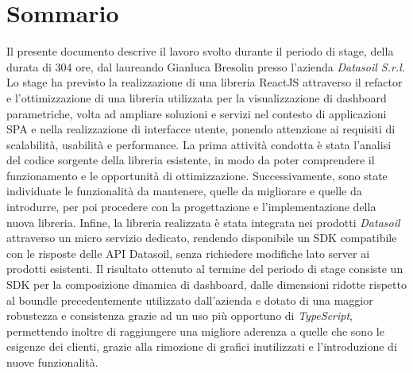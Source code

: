 \cleardoublepage
{}
\blankpage
{}
\begingroup
\let\clearpage\relax
\let\cleardoublepage\relax
\chapter*{Sommario}

Il presente documento descrive il lavoro svolto durante il periodo di stage, della durata di 304 ore, dal laureando Gianluca Bresolin
presso l'azienda \textit{Datasoil S.r.l.} Lo stage ha previsto la realizzazione di una libreria ReactJS attraverso il refactor
e l'ottimizzazione di una libreria utilizzata per la visualizzazione di dashboard parametriche, volta ad ampliare soluzioni e servizi
nel contesto di applicazioni SPA e nella realizzazione di interfacce utente, ponendo attenzione ai requisiti di scalabilità,
usabilità e performance. \newline
La prima attività condotta è stata l'analisi del codice sorgente della libreria esistente, in modo da poter comprendere il funzionamento e le opportunità
di ottimizzazione. Successivamente, sono state individuate le funzionalità da mantenere, quelle da migliorare e quelle da introdurre,
per poi procedere con la progettazione e l'implementazione della nuova libreria. \newline
Infine, la libreria realizzata è stata integrata nei prodotti \textit{Datasoil} attraverso un micro servizio dedicato, rendendo disponibile un SDK
compatibile con le risposte delle API Datasoil, senza richiedere modifiche lato server ai prodotti esistenti. \newline
Il risultato ottenuto al termine del periodo di stage consiste un SDK per la composizione dinamica di dashboard, dalle dimensioni ridotte rispetto
al boundle precedentemente utilizzato dall'azienda e dotato di una maggior robustezza e consistenza grazie ad un uso più opportuno di \textit{TypeScript},
permettendo inoltre di raggiungere una migliore aderenza a quelle che sono le esigenze dei clienti, grazie alla rimozione di grafici inutilizzati e
l'introduzione di nuove funzionalità.


\endgroup
\vfill

